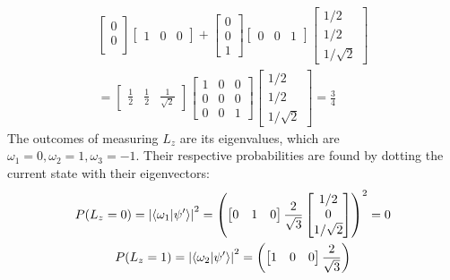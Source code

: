\documentclass{report}
\theoremstyle{definition}
\begin{document}
\begin{chapter4}
\begin{gather*}
{\begin{bmatrix}
				0 \\
				0 \\
			\end{bmatrix}
			\begin{bmatrix}
				1 & 0 & 0  	
			\end{bmatrix}
			+
			\begin{bmatrix}
				0 \\
				0 \\
				1  	
			\end{bmatrix}
			\begin{bmatrix}
				0 & 0 & 1  	
			\end{bmatrix}}
			{\begin{bmatrix}
				1/2 \\
				1/2 \\
				1/\sqrt{2}  	
			\end{bmatrix}} \\
			= \begin{bmatrix}
				\frac{1}{2} & \frac{1}{2} & \frac{1}{\sqrt{2}}  	
			\end{bmatrix}
			\begin{bmatrix}
				1 & 0 & 0\\
				0 & 0 & 0\\
				0 & 0 & 1
			\end{bmatrix}
			\begin{bmatrix}
				1/2 \\
				1/2 \\
				1/\sqrt{2}  	
			\end{bmatrix}
			= \frac{3}{4}
		\end{gather*}
		The outcomes of measuring $L_z$ are its eigenvalues, which are $\omega_1 = 0, \omega_2 = 1, \omega_3 = -1$. Their respective probabilities are found by dotting the current state with their eigenvectors:
		\begin{gather*}
			P(L_z = 0) = \abs{\braket{\omega_1}{\psi '}}^2 =
			\pqty{\begin{bmatrix}
				 0 & 1 & 0
			\end{bmatrix}
			\frac{2}{\sqrt 3}
			\begin{bmatrix}
				1/2 \\
				0 \\
				1/\sqrt{2}
			\end{bmatrix}}^2 = 0 \\
			P(L_z = 1) = \abs{\braket{\omega_2}{\psi '}}^2 =
			\pqty{\begin{bmatrix}
				 1 & 0 & 0
			\end{bmatrix}
			\frac{2}{\sqrt 3}
}
\end{gather*}
\end{chapter4}
\end{document}
